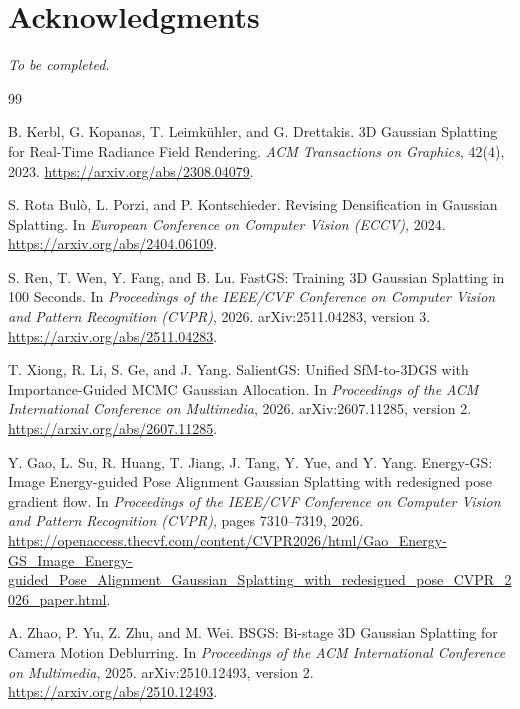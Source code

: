 \documentclass[10pt]{article}
\begin{document}
\section*{Acknowledgments}

\textit{To be completed.}

\begin{thebibliography}{99}
\small

B. Kerbl, G. Kopanas, T. Leimk\"uhler, and G. Drettakis.
\newblock 3D Gaussian Splatting for Real-Time Radiance Field Rendering.
\newblock \emph{ACM Transactions on Graphics}, 42(4), 2023.
\newblock \url{https://arxiv.org/abs/2308.04079}.

S. Rota Bul\`o, L. Porzi, and P. Kontschieder.
\newblock Revising Densification in Gaussian Splatting.
\newblock In \emph{European Conference on Computer Vision (ECCV)}, 2024.
\newblock \url{https://arxiv.org/abs/2404.06109}.

S. Ren, T. Wen, Y. Fang, and B. Lu.
\newblock FastGS: Training 3D Gaussian Splatting in 100 Seconds.
\newblock In \emph{Proceedings of the IEEE/CVF Conference on Computer Vision
and Pattern Recognition (CVPR)}, 2026. arXiv:2511.04283, version 3.
\newblock \url{https://arxiv.org/abs/2511.04283}.

T. Xiong, R. Li, S. Ge, and J. Yang.
\newblock SalientGS: Unified SfM-to-3DGS with Importance-Guided MCMC Gaussian
Allocation.
\newblock In \emph{Proceedings of the ACM International Conference on
Multimedia}, 2026. arXiv:2607.11285, version 2.
\newblock \url{https://arxiv.org/abs/2607.11285}.

Y. Gao, L. Su, R. Huang, T. Jiang, J. Tang, Y. Yue, and Y. Yang.
\newblock Energy-GS: Image Energy-guided Pose Alignment Gaussian Splatting
with redesigned pose gradient flow.
\newblock In \emph{Proceedings of the IEEE/CVF Conference on Computer Vision
and Pattern Recognition (CVPR)}, pages 7310--7319, 2026.
\newblock \url{https://openaccess.thecvf.com/content/CVPR2026/html/Gao_Energy-GS_Image_Energy-guided_Pose_Alignment_Gaussian_Splatting_with_redesigned_pose_CVPR_2026_paper.html}.

A. Zhao, P. Yu, Z. Zhu, and M. Wei.
\newblock BSGS: Bi-stage 3D Gaussian Splatting for Camera Motion Deblurring.
\newblock In \emph{Proceedings of the ACM International Conference on
Multimedia}, 2025. arXiv:2510.12493, version 2.
\newblock \url{https://arxiv.org/abs/2510.12493}.


\end{thebibliography}
\end{document}
